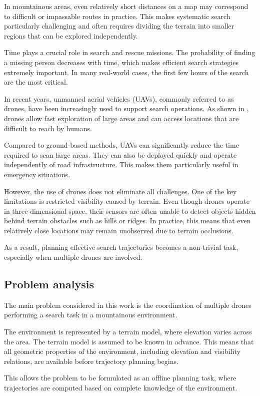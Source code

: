 \documentclass[english]{projectreport}
\begin{document}
In mountainous areas, even relatively short distances on a map may correspond
to difficult or impassable routes in practice. This makes systematic search
particularly challenging and often requires dividing the terrain into smaller
regions that can be explored independently.

Time plays a crucial role in search and rescue missions. The probability of
finding a missing person decreases with time, which makes efficient search
strategies extremely important. In many real-world cases, the first few hours
of the search are the most critical.

In recent years, unmanned aerial vehicles (UAVs), commonly referred to as
drones, have been increasingly used to support search operations. As shown
in \cite{goodrich2008uav}, drones allow fast exploration of large areas and can access locations
that are difficult to reach by humans.

Compared to ground-based methods, UAVs can significantly reduce the time
required to scan large areas. They can also be deployed quickly and operate
independently of road infrastructure. This makes them particularly useful
in emergency situations.

However, the use of drones does not eliminate all challenges. One of the
key limitations is restricted visibility caused by terrain. Even though
drones operate in three-dimensional space, their sensors are often unable
to detect objects hidden behind terrain obstacles such as hills or ridges.
In practice, this means that even relatively close locations may remain
unobserved due to terrain occlusions.

As a result, planning effective search trajectories becomes a non-trivial task,
especially when multiple drones are involved.

\subsection{Problem analysis}

The main problem considered in this work is the coordination of multiple
drones performing a search task in a mountainous environment.

The environment is represented by a terrain model, where elevation varies
across the area. The terrain model is assumed to be known in advance. This
means that all geometric properties of the environment, including elevation
and visibility relations, are available before trajectory planning begins.

This allows the problem to be formulated as an offline planning task, where
trajectories are computed based on complete knowledge of the environment.
\end{document}

